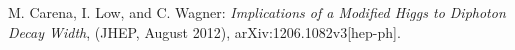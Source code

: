 \documentclass[letterpaper,12pt]{article}
\begin{document}

\begin{thebibliography}{99}

M. Carena, I. Low, and C. Wagner: \textit{Implications of a Modified Higgs to Diphoton Decay Width},
(JHEP, August 2012), arXiv:1206.1082v3[hep-ph].

\end{thebibliography}
\end{document}
